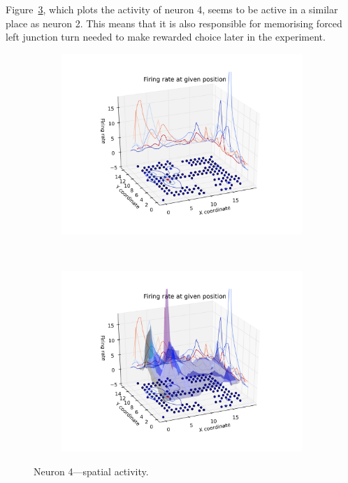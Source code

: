 \documentclass[11pt,a4paper,twocolumn]{article}
\begin{document}
Figure~\ref{fig:3d_n4}, which plots the activity of neuron 4, seems to be active in a similar place as neuron 2. This means that it is also responsible for memorising forced left junction turn needed to make rewarded choice later in the experiment.\\

\begin{figure}[h]
  \begin{subfigure}{.99\linewidth}\centering
    \includegraphics[width=1.1\textwidth]{figure9_a.png}
    \caption{\label{fig:3d_n4_a}}
  \end{subfigure}\\[1ex]
  \begin{subfigure}{.99\linewidth}\centering
    \includegraphics[width=1.1\textwidth]{figure9_b.png}
    \caption{\label{fig:3d_n4_b}}
  \end{subfigure}

  \caption{Neuron 4---spatial activity.\label{fig:3d_n4}}
\end{figure}
\end{document}
